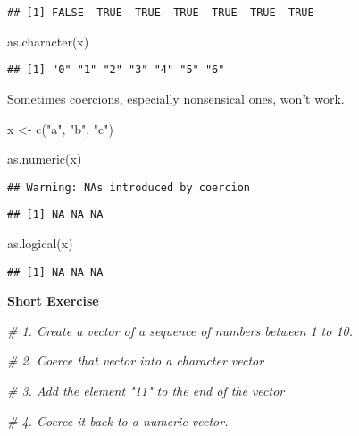 \documentclass[
]{book}
\newenvironment{Shaded}{\begin{snugshade}}{\end{snugshade}}
\newcommand{\CommentTok}[1]{\textcolor[rgb]{0.56,0.35,0.01}{\textit{#1}}}
\newcommand{\FunctionTok}[1]{\textcolor[rgb]{0.00,0.00,0.00}{#1}}
\newcommand{\NormalTok}[1]{#1}
\newcommand{\OtherTok}[1]{\textcolor[rgb]{0.56,0.35,0.01}{#1}}
\newcommand{\StringTok}[1]{\textcolor[rgb]{0.31,0.60,0.02}{#1}}
\begin{document}
\begin{verbatim}
## [1] FALSE  TRUE  TRUE  TRUE  TRUE  TRUE  TRUE
\end{verbatim}

\begin{Shaded}
\begin{Highlighting}[]
\FunctionTok{as.character}\NormalTok{(x)}
\end{Highlighting}
\end{Shaded}

\begin{verbatim}
## [1] "0" "1" "2" "3" "4" "5" "6"
\end{verbatim}

Sometimes coercions, especially nonsensical ones, won't work.

\begin{Shaded}
\begin{Highlighting}[]
\NormalTok{x }\OtherTok{\textless{}{-}} \FunctionTok{c}\NormalTok{(}\StringTok{"a"}\NormalTok{, }\StringTok{"b"}\NormalTok{, }\StringTok{"c"}\NormalTok{)}

\FunctionTok{as.numeric}\NormalTok{(x)}
\end{Highlighting}
\end{Shaded}

\begin{verbatim}
## Warning: NAs introduced by coercion
\end{verbatim}

\begin{verbatim}
## [1] NA NA NA
\end{verbatim}

\begin{Shaded}
\begin{Highlighting}[]
\FunctionTok{as.logical}\NormalTok{(x)}
\end{Highlighting}
\end{Shaded}

\begin{verbatim}
## [1] NA NA NA
\end{verbatim}

\textbf{Short Exercise}

\begin{Shaded}
\begin{Highlighting}[]
\CommentTok{\# 1. Create a vector of a sequence of numbers between 1 to 10.}

\CommentTok{\# 2. Coerce that vector into a character vector}

\CommentTok{\# 3. Add the element "11" to the end of the vector}

\CommentTok{\# 4. Coerce it back to a numeric vector.}
\end{Highlighting}
\end{Shaded}
\end{document}
